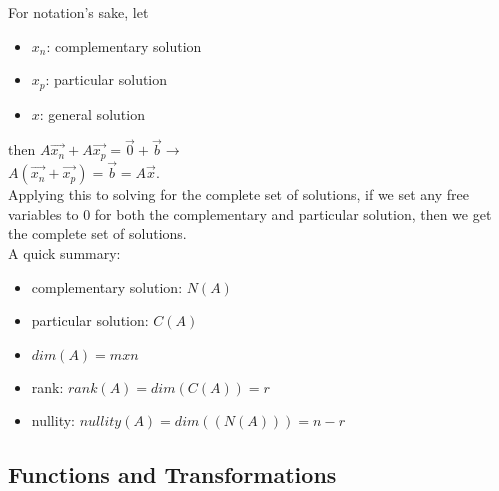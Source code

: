For notation's sake, let

\begin{itemize}
	\item $x_n$: complementary solution
	\item $x_p$: particular solution
	\item $x$: general solution
\end{itemize}

then $A\vec{x_n} + A\vec{x_p} = \vec{0} + \vec{b} \rightarrow$
\\

$A(\vec{x_n} + \vec{x_p}) = \vec{b} = A\vec{x}$.
\\

Applying this to solving for the complete set of solutions, if we set any free variables to 0 for both the complementary and particular solution, then we get the complete set of solutions.
\\

A quick summary:
\begin{itemize}
	\item complementary solution: $N(A)$
	\item particular solution: $C(A)$
	\item $dim(A) = m x n$
	\item rank: $rank(A) = dim(C(A)) = r$
	\item nullity: $nullity(A) = dim((N(A))) = n-r$
\end{itemize}


\subsection{Functions and Transformations}\label{concept2.8}
























